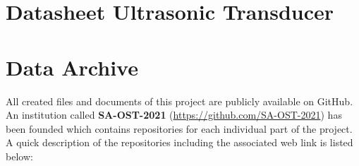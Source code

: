 \fi

\section{Datasheet Ultrasonic Transducer} \label{appendix_ma401a6}
\enlargethispage{2.5cm}
\begin{adjustwidth}{-0.23cm}{0cm} \hfuzz=7.0pt \vfuzz=20.0pt
\end{adjustwidth}
\newpage




\section{Data Archive} \label{Data Archive}
All created files and documents of this project are publicly available on GitHub. An institution called \textbf{SA-OST-2021} (\url{https://github.com/SA-OST-2021}) has been founded which contains repositories for each individual part of the project.
A quick description of the repositories including the associated web link is listed below:

